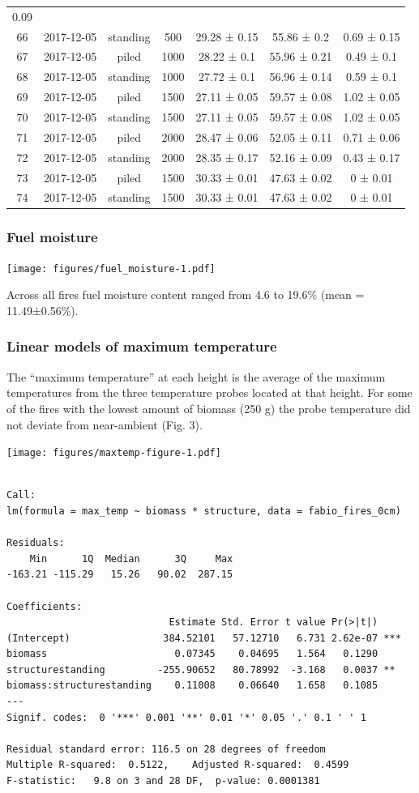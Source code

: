 \documentclass[11pt,a4paper]{article}
\begin{document}
\begin{longtable}[]{@{}ccccccc@{}}
0.09\tabularnewline
66 & 2017-12-05 & standing & 500 & 29.28 ± 0.15 & 55.86 ± 0.2 & 0.69 ±
0.15\tabularnewline
67 & 2017-12-05 & piled & 1000 & 28.22 ± 0.1 & 55.96 ± 0.21 & 0.49 ±
0.1\tabularnewline
68 & 2017-12-05 & standing & 1000 & 27.72 ± 0.1 & 56.96 ± 0.14 & 0.59 ±
0.1\tabularnewline
69 & 2017-12-05 & piled & 1500 & 27.11 ± 0.05 & 59.57 ± 0.08 & 1.02 ±
0.05\tabularnewline
70 & 2017-12-05 & standing & 1500 & 27.11 ± 0.05 & 59.57 ± 0.08 & 1.02 ±
0.05\tabularnewline
71 & 2017-12-05 & piled & 2000 & 28.47 ± 0.06 & 52.05 ± 0.11 & 0.71 ±
0.06\tabularnewline
72 & 2017-12-05 & standing & 2000 & 28.35 ± 0.17 & 52.16 ± 0.09 & 0.43 ±
0.17\tabularnewline
73 & 2017-12-05 & piled & 1500 & 30.33 ± 0.01 & 47.63 ± 0.02 & 0 ±
0.01\tabularnewline
74 & 2017-12-05 & standing & 1500 & 30.33 ± 0.01 & 47.63 ± 0.02 & 0 ±
0.01\tabularnewline
\bottomrule
\end{longtable}

\hypertarget{fuel-moisture}{%
\subsubsection{Fuel moisture}\label{fuel-moisture}}

\texttt{[image: figures/fuel\_moisture-1.pdf]}

Across all fires fuel moisture content ranged from 4.6 to 19.6\% (mean =
11.49±0.56\%).

\hypertarget{linear-models-of-maximum-temperature}{%
\subsubsection{Linear models of maximum
temperature}\label{linear-models-of-maximum-temperature}}

The ``maximum temperature'' at each height is the average of the maximum
temperatures from the three temperature probes located at that height.
For some of the fires with the lowest amount of biomass (250 g) the
probe temperature did not deviate from near-ambient (Fig. 3).

\texttt{[image: figures/maxtemp-figure-1.pdf]}

\begin{verbatim}

Call:
lm(formula = max_temp ~ biomass * structure, data = fabio_fires_0cm)

Residuals:
    Min      1Q  Median      3Q     Max 
-163.21 -115.29   15.26   90.02  287.15 

Coefficients:
                            Estimate Std. Error t value Pr(>|t|)    
(Intercept)                384.52101   57.12710   6.731 2.62e-07 ***
biomass                      0.07345    0.04695   1.564   0.1290    
structurestanding         -255.90652   80.78992  -3.168   0.0037 ** 
biomass:structurestanding    0.11008    0.06640   1.658   0.1085    
---
Signif. codes:  0 '***' 0.001 '**' 0.01 '*' 0.05 '.' 0.1 ' ' 1

Residual standard error: 116.5 on 28 degrees of freedom
Multiple R-squared:  0.5122,    Adjusted R-squared:  0.4599 
F-statistic:   9.8 on 3 and 28 DF,  p-value: 0.0001381
\end{verbatim}
\end{document}
